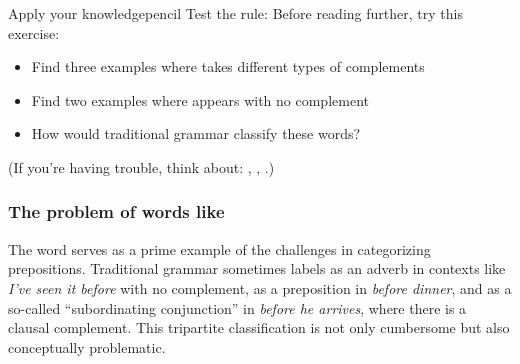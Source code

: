 \begin{tblsframedsymbol}{Apply your knowledge}{pencil}
Test the rule: Before reading further, try this exercise:
\begin{itemize}[noitemsep, leftmargin=*]
    \item Find three examples where  takes different types of complements
    \item Find two examples where  appears with no complement
    \item How would traditional grammar classify these words?
\end{itemize}
(If you're having trouble, think about: , , .)
\end{tblsframedsymbol}

\subsubsection*{The problem of words like } \label{sec:likebefore}

The word  serves as a prime example of the challenges in categorizing prepositions. Traditional grammar sometimes labels  as an adverb in contexts like \textit{I've seen it \emph{before}} with no complement, as a preposition in \textit{before \emph{dinner}}, and as a so-called ``subordinating conjunction'' in \textit{before \emph{he arrives}}, where there is a clausal complement. This tripartite classification is not only cumbersome but also conceptually problematic.

